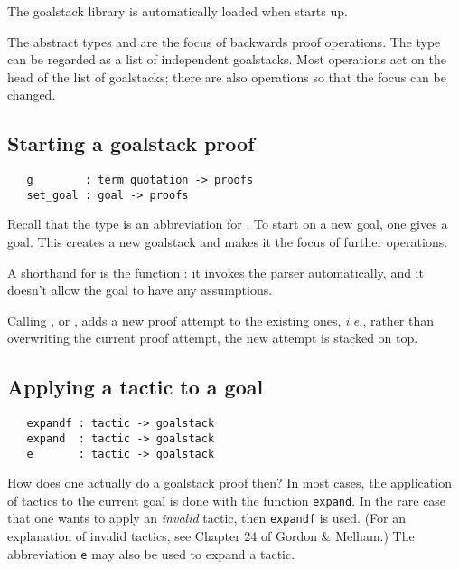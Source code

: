 The goalstack library is automatically loaded when \HOL{} starts up.

The abstract types  and  are the
focus of backwards proof operations. The type  can be
regarded as a list of independent goalstacks. Most operations act on
the head of the list of goalstacks; there are also operations so that
the focus can be changed.

\subsection{Starting a goalstack proof}

\begin{hol}
\begin{verbatim}
   g        : term quotation -> proofs
   set_goal : goal -> proofs
\end{verbatim}
\end{hol}

Recall that the type  is an abbreviation for
. To start on a new goal, one gives
 a goal. This creates a new goalstack and makes it the
focus of further operations.

A shorthand for  is the function : it
invokes the parser automatically, and it doesn't allow the goal to
have any assumptions.

Calling , or , adds a new proof attempt to the
existing ones, \textit{i.e.}, rather than overwriting the current
proof attempt, the new attempt is stacked on top.

\subsection{Applying a tactic to a goal}

\begin{hol}
\begin{verbatim}
   expandf : tactic -> goalstack
   expand  : tactic -> goalstack
   e       : tactic -> goalstack
\end{verbatim}
\end{hol}

How does one actually do a goalstack proof then? In most cases, the
application of tactics to the current goal is done with the function
\verb+expand+. In the rare case that one wants to apply an
{\it invalid\/} tactic, then \verb+expandf+ is used. (For an
explanation of invalid tactics, see Chapter 24 of Gordon \& Melham.) The
abbreviation \verb+e+ may also be used to expand a tactic.


